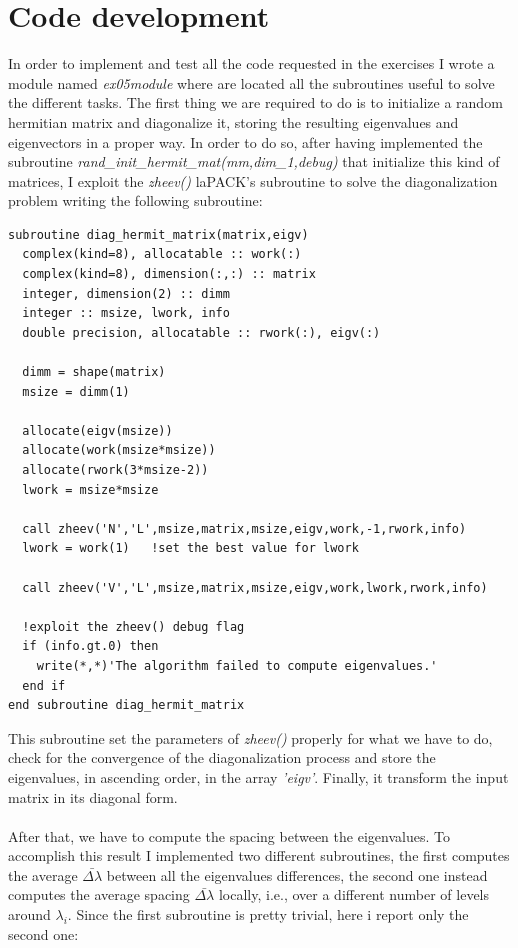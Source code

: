 \documentclass[prb,9pt,notitlepage]{revtex4-1}
\begin{document}
\section{Code development}
In order to implement and test all the code requested in the exercises I wrote a module named \textit{ex05module} where are located all the subroutines useful to solve the different tasks. The first thing we are required to do is to initialize a random hermitian matrix and diagonalize it, storing the resulting eigenvalues and eigenvectors in a proper way. In order to do so, after having implemented the subroutine \textit{rand\_init\_hermit\_mat(mm,dim\_1,debug)} that initialize this kind of matrices, I exploit the \textit{zheev()} laPACK's subroutine to solve the diagonalization problem writing the following subroutine:
\begin{lstlisting}
subroutine diag_hermit_matrix(matrix,eigv)
  complex(kind=8), allocatable :: work(:)
  complex(kind=8), dimension(:,:) :: matrix
  integer, dimension(2) :: dimm
  integer :: msize, lwork, info
  double precision, allocatable :: rwork(:), eigv(:)

  dimm = shape(matrix)
  msize = dimm(1)

  allocate(eigv(msize))
  allocate(work(msize*msize))
  allocate(rwork(3*msize-2))
  lwork = msize*msize

  call zheev('N','L',msize,matrix,msize,eigv,work,-1,rwork,info)
  lwork = work(1)   !set the best value for lwork

  call zheev('V','L',msize,matrix,msize,eigv,work,lwork,rwork,info)

  !exploit the zheev() debug flag
  if (info.gt.0) then
    write(*,*)'The algorithm failed to compute eigenvalues.'
  end if
end subroutine diag_hermit_matrix
\end{lstlisting}
This subroutine set the parameters of \textit{zheev()} properly for what we have to do, check for the convergence of the diagonalization process and store the eigenvalues, in ascending order, in the array \textit{'eigv'}. Finally, it transform the input matrix in its diagonal form.
\\ \\
After that, we have to compute the spacing between the eigenvalues. To accomplish this result I implemented two different subroutines, the first computes the average $\bar{\Delta \lambda}$  between all the eigenvalues differences, the second one instead computes the average spacing $\bar{\Delta \lambda}$ locally, i.e., over a different number of levels around $\lambda_i$. Since the first subroutine is pretty trivial, here i report only the second one:
\end{document}
